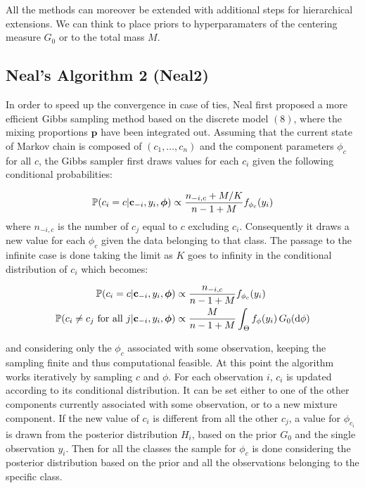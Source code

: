 All the methods can moreover be extended with additional steps for hierarchical extensions. We can think to place priors to hyperparamaters of the centering measure $G_0$ or to the total mass $M$.



\subsection{Neal's Algorithm 2 (Neal2)}
In order to speed up the convergence in case of ties, Neal first proposed a more efficient Gibbs sampling method based on the discrete model $(8)$, where the mixing proportions $\textbf{p}$ have been integrated out. Assuming that the current state of Markov chain is composed of $(c_1,\dots,c_n)$  and the component parameters $\phi_c$ for all $c$, the Gibbs sampler first draws values for each $c_i$ given the following conditional probabilities:


\begin{align}
			\mathbb P(c_{i}=c | \mathbf c_{-i}, y_{i},\boldsymbol\phi) \propto \frac{n_{-i,c} + M/{K}}{n-1+M} f_{\phi_{c}}(y_{i}) 
\end{align}
where $n_{-i,c}$ is the number of $c_j$ equal to $c$ excluding $c_i$. Consequently it draws a new value for each $\phi_c$ given the data belonging to that class. The passage to the infinite case is done taking the limit as $K$ goes to infinity in the conditional distribution of $c_i$ which becomes:


\begin{align}
			\mathbb P(c_{i}=c | \mathbf c_{-i}, y_{i},\boldsymbol\phi) &\propto \frac{n_{-i,c} }{n-1+M} f_{\phi_{c}}(y_{i}) \\
			\mathbb P(c_{i}\neq c_{j} \text{ for all } j | \mathbf c_{-i}, y_{i},\boldsymbol\phi) &\propto \frac{M }{n-1+M} \int_{\Theta} f_{\phi}(y_{i}) \, G_0(\mathrm d\phi) \nonumber 
\end{align}

and considering only the $\phi_c$ associated with some observation, keeping the sampling finite and thus computational feasible. At this point the algorithm works iteratively by sampling $c$ and $\phi$. For each observation $i$, $c_i$ is updated according to its conditional distribution. It can be set either to one of the other components currently associated with some observation, or to a new mixture component.  If the new value of $c_i$ is different from all the other $c_j$, a value for $\phi_{c_i}$ is drawn from the posterior distribution $H_i$, based on the prior $G_0$ and the single observation $y_i$. Then for all the classes the  sample for $\phi_c$ is done considering the posterior distribution based on the prior and all the observations belonging to the specific class.

